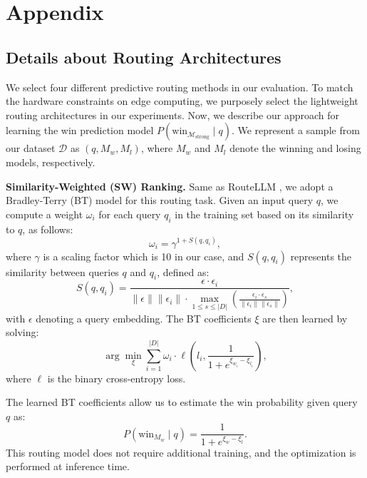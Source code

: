 \newpage
\onecolumn
\section{Appendix}
\subsection{Details about Routing Architectures}
We select four different predictive routing methods in our evaluation. To match the hardware constraints on edge computing, we purposely select the lightweight routing architectures in our experiments. Now, we describe our approach for learning the win prediction model \( P(\text{win}_{\mathcal{M}_{\text{strong}}} \mid q) \). We represent a sample from our dataset \( \mathcal{D} \) as \( (q, M_w, M_l) \), where \( M_w \) and \( M_l \) denote the winning and losing models, respectively.


\textbf{Similarity-Weighted (SW) Ranking.} 
Same as RouteLLM \cite{Ong2024RouteLLMLT}, we adopt a Bradley-Terry (BT) model \cite{Bradley1952RankAO} for this routing task. Given an input query \( q \), we compute a weight \( \omega_i \) for each query \( q_i \) in the training set based on its similarity to \( q \), as follows:
\begin{equation}
\omega_i = \gamma^{1 + S(q, q_i)},
\end{equation}
where \( \gamma \) is a scaling factor which is 10 in our case, and \( S(q, q_i) \) represents the similarity between queries \( q \) and \( q_i \), defined as:
\begin{equation}
S(q, q_i) = \frac{\epsilon \cdot \epsilon_i}{\|\epsilon\| \|\epsilon_i\| \cdot \max_{1 \leq s \leq |D|} \left( \frac{\epsilon_i \cdot \epsilon_s}{\|\epsilon_i\| \|\epsilon_s\|} \right)} ,
\end{equation}
with \( \epsilon \) denoting a query embedding. The BT coefficients \( \xi \) are then learned by solving:
\begin{equation}
\arg\min_{\xi} \sum_{i=1}^{|D|} \omega_i \cdot \ell \left( l_i, \frac{1}{1 + e^{\xi_{w_i} - \xi_{l_i}}} \right),
\end{equation}
where \( \ell \) is the binary cross-entropy loss.

The learned BT coefficients allow us to estimate the win probability given query \( q \) as:
\begin{equation}
P(\text{win}_{M_w} \mid q) = \frac{1}{1 + e^{\xi_w - \xi_l}}.
\end{equation}
This routing model does not require additional training, and the optimization is performed at inference time.


